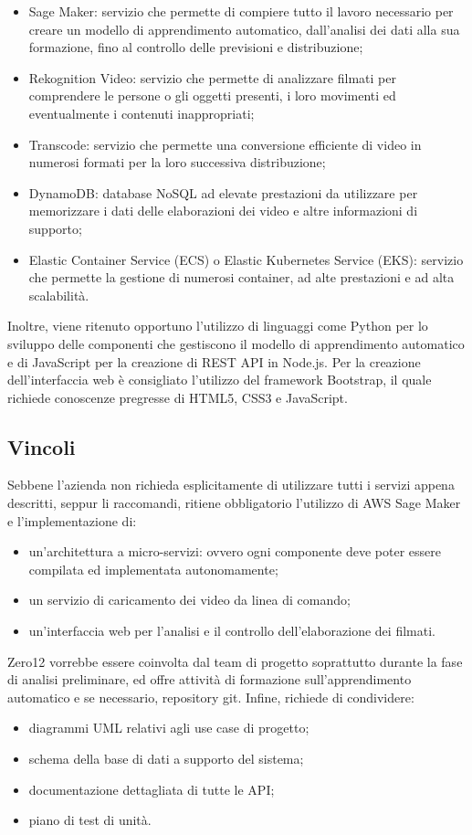 \begin{itemize}
\item Sage Maker: servizio che permette di compiere tutto il lavoro necessario per creare un modello di apprendimento automatico, dall'analisi dei dati alla sua formazione, fino al controllo delle previsioni e distribuzione;
\item Rekognition Video: servizio che permette di analizzare filmati per comprendere le persone o gli oggetti presenti, i loro movimenti ed eventualmente i contenuti inappropriati;
\item Transcode: servizio che permette una conversione efficiente di video in numerosi formati per la loro successiva distribuzione;
\item DynamoDB: database NoSQL ad elevate prestazioni da utilizzare per memorizzare i dati delle elaborazioni dei video e altre informazioni di supporto;
\item Elastic Container Service (ECS) o Elastic Kubernetes Service (EKS): servizio che permette la gestione di numerosi container, ad alte prestazioni e ad alta scalabilit\`a.
\end{itemize}
Inoltre, viene ritenuto opportuno l'utilizzo di linguaggi come Python per lo sviluppo delle componenti che gestiscono il modello di apprendimento automatico e di JavaScript per la creazione di REST API in Node.js. Per la creazione dell'interfaccia web \`e consigliato l'utilizzo del framework Bootstrap, il quale richiede conoscenze pregresse di HTML5, CSS3 e JavaScript.

\subsection{Vincoli}
Sebbene l'azienda non richieda esplicitamente di utilizzare tutti i servizi appena descritti, seppur li raccomandi, ritiene obbligatorio l'utilizzo di AWS Sage Maker e l'implementazione di:

\begin{itemize}
\item un'architettura a micro-servizi: ovvero ogni componente deve poter essere compilata ed implementata autonomamente;
\item un servizio di caricamento dei video da linea di comando;
\item un'interfaccia web per l'analisi e il controllo dell'elaborazione dei filmati.
\end{itemize}
Zero12 vorrebbe essere coinvolta dal team di progetto soprattutto durante la fase di analisi preliminare, ed offre attivit\`a di formazione sull'apprendimento automatico e se necessario, repository git.
Infine, richiede di condividere:
\begin{itemize}
\item diagrammi UML relativi agli use case di progetto;
\item schema della base di dati a supporto del sistema;
\item documentazione dettagliata di tutte le API;
\item piano di test di unit\`a.
\end{itemize}

